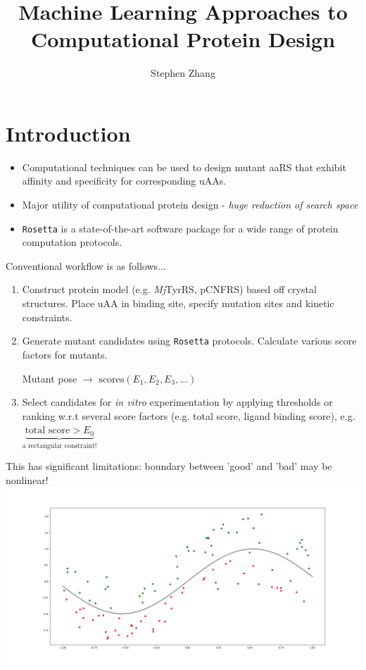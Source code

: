 \documentclass{beamer}
\title{Machine Learning Approaches to Computational Protein Design}
\author{Stephen Zhang}
\begin{document}
\begin{frame}
  \titlepage
\end{frame}

\section{Introduction}

\begin{frame}
    \begin{itemize}
        \item Computational techniques can be used to design mutant aaRS that exhibit affinity and specificity for corresponding uAAs.
        \item Major utility of computational protein design - \textit{huge reduction of search space}
        \item \texttt{Rosetta} is a state-of-the-art software package for a wide range of protein computation protocols.
    \end{itemize}
\end{frame}

\begin{frame}
    Conventional workflow is as follows...
    \begin{enumerate}
        \item Construct protein model (e.g. \textit{Mj}TyrRS, pCNFRS) based off crystal structures. Place uAA in binding site, specify mutation sites and kinetic constraints.
        \item Generate mutant candidates using \texttt{Rosetta} protocols. Calculate various score factors for mutants.
        \begin{center}Mutant pose $\to$ $\mathrm{scores}(E_1, E_2, E_3, ...)$\end{center}
        \item Select candidates for \textit{in vitro} experimentation by applying thresholds or ranking w.r.t several score factors (e.g. total score, ligand binding score), e.g. $\underbrace{\text{total score} > E_0}_{\text{a rectangular constraint!}}$
    \end{enumerate}
\end{frame}

\begin{frame}
    This has significant limitations: boundary between 'good' and 'bad' may be nonlinear! \\
    \includegraphics[width=\linewidth]{diagram2.png}
\end{frame}
\end{document}
